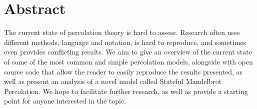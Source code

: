 

\begingroup
\let\clearpage\relax
\let\cleardoublepage\relax
\let\cleardoublepage\relax

\chapter*{Abstract}

The current state of percolation theory is hard to assess. Research often uses different methods, language and notation, is hard to reproduce, and sometimes even provides conflicting results. We aim to give an overview of the current state of some of the most common and simple percolation models, alongside with open source code that allow the reader to easily reproduce the results presented, as well as present an analysis of a novel model called Stateful Mandelbrot Percolation. We hope to facilitate further research, as well as provide a starting point for anyone interested in the topic.

\endgroup			

\vfill